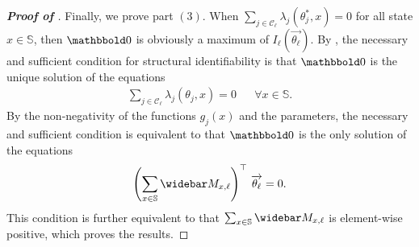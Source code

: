 \documentclass[pdflatex,sn-mathphys-num]{sn-jnl}%
\theoremstyle{thmstyleone}%
\theoremstyle{thmstyletwo}%
\theoremstyle{thmstylethree}%
\begin{document}
\begin{appendices}
\begin{proof}[\textbf{Proof of }]
    Finally, we prove part $(3)$.
    When $\sum_{j\in\mathcal C_\ell} \lambda_{j}(\theta^*_j,x) = 0$ for all state $x\in\mathbb S$, then $\mathbbold 0$ is obviously a maximum of $I_\ell\left(\overrightarrow{\theta_\ell}\right)$. 
    By , the necessary and sufficient condition for structural identifiability is that $\mathbbold 0$ is the unique solution of the equations
    \begin{align*}
        \sum_{j\in\mathcal C_\ell} \lambda_{j}(\theta_j,x) = 0
        && \forall x\in\mathbb S.
    \end{align*}
    By the non-negativity of the functions $g_j(x)$ and the parameters, the necessary and sufficient condition is equivalent to that $\mathbbold 0$ is the only solution of the equations
    \begin{align*}
        \left(\sum_{x\in \mathbb S} \widebar M_{x,\ell}\right)^{\top}\, \overrightarrow{\theta_\ell} = 0.
    \end{align*}
    This condition is further equivalent to that $\sum_{x\in \mathbb S} \widebar M_{x,\ell}$ is element-wise positive, which proves the results.
\end{proof}



 ~\\~\\~\\~\\~


\end{appendices}
\end{document}
